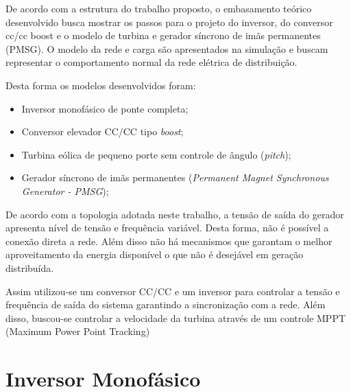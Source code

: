 
De acordo com a estrutura do trabalho proposto, o embasamento teórico desenvolvido busca mostrar os passos para o projeto do inversor, do conversor cc/cc boost e o modelo de turbina e gerador síncrono de imãs permanentes (PMSG). O modelo da rede e carga são apresentados na simulação e buscam representar o comportamento normal da rede elétrica de distribuição.

Desta forma os modelos desenvolvidos foram:

\begin{itemize}
    \item Inversor monofásico de ponte completa;
    \item Conversor elevador CC/CC tipo \textit{boost};
    \item Turbina eólica de pequeno porte sem controle de ângulo (\textit{pitch});
    \item Gerador síncrono de imãs permanentes (\textit{Permanent Magnet Synchronous Generator - PMSG});
\end{itemize}


De acordo com a topologia adotada neste trabalho, a tensão de saída do gerador apresenta nível de tensão e frequência variável. Desta forma, não é possível a conexão direta a rede. Além disso não há mecanismos que garantam o melhor aproveitamento da energia disponível o que não é desejável em geração distribuída. 

Assim utilizou-se um conversor CC/CC e um inversor para controlar a tensão e frequência de saída do sistema garantindo a sincronização com a rede. Além disso, buscou-se controlar a velocidade da turbina através de um controle MPPT (Maximum Power Point Tracking)
\section{Inversor Monofásico}
